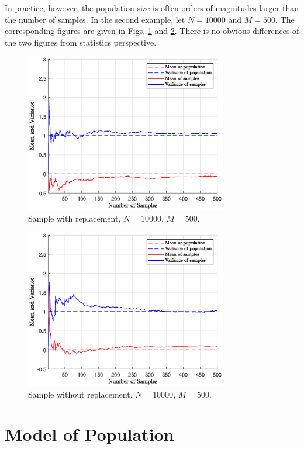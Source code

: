 In practice, however, the population size is often orders of magnitudes larger than the number of samples. In the second example, let $N=10000$ and $M=500$. The corresponding figures are given in Figs. \ref{ch:sampling:fig:sample-wr-n10000} and \ref{ch:sampling:fig:sample-nwr-n10000}. There is no obvious differences of the two figures from statistics perspective.

\begin{figure}
	\centering
	\includegraphics[width=250pt]{chapters/ch-sampling/figures/sample-wr-n10000.eps}
	\caption{Sample with replacement, $N=10000$, $M=500$.} \label{ch:sampling:fig:sample-wr-n10000}
\end{figure}

\begin{figure}
	\centering
	\includegraphics[width=250pt]{chapters/ch-sampling/figures/sample-nwr-n10000.eps}
	\caption{Sample without replacement, $N=10000$, $M=500$.} \label{ch:sampling:fig:sample-nwr-n10000}
\end{figure}

\section{Model of Population}

